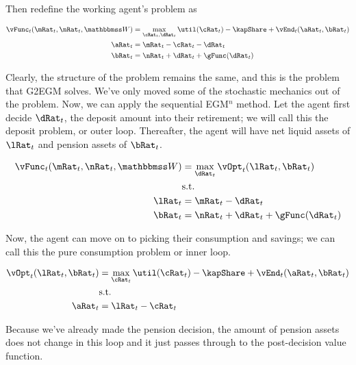 \documentclass[\econtexRoot/SequentialEGM]{subfiles}
\begin{document}
Then redefine the working agent's problem as

\begin{equation}
  \begin{split}
    \vFunc_{t}(\mRat_{t}, \nRat_{t}, \Work) & = \max_{\cRat_{t},
      \dRat_{t}} \util(\cRat_{t})  - \kapShare + \vEnd_{t}(\aRat_{t},
    \bRat_{t}) \\
    \aRat_{t} & = \mRat_{t} - \cRat_{t} - \dRat_{t} \\
    \bRat_{t} & = \nRat_{t} + \dRat_{t} + \gFunc(\dRat_{t}) \\
  \end{split}
\end{equation}

Clearly, the structure of the problem remains the same, and this is the problem
that G2EGM solves. We've only moved some
of the stochastic mechanics out of the problem. Now, we can apply the
sequential EGM$^n$ method. Let the agent first decide $\dRat_{t}$, the deposit
amount into their retirement; we will call this the deposit problem, or outer loop. Thereafter, the
agent will have net liquid assets
of $\lRat_{t}$ and pension assets of $\bRat_{t}$.

\begin{equation}
  \begin{split}
    \vFunc_{t}(\mRat_{t}, \nRat_{t}, \Work) & = \max_{\dRat_{t}}
    \vOpt_{t}(\lRat_{t}, \bRat_{t}) \\
    & \text{s.t.} \\
    \lRat_{t} & = \mRat_{t} - \dRat_{t} \\
    \bRat_{t} & = \nRat_{t} + \dRat_{t} + \gFunc(\dRat_{t})
  \end{split}
\end{equation}

Now, the agent can move on to picking their consumption and savings; we can call this
the pure consumption problem or inner loop.

\begin{equation}
  \begin{split}
    \vOpt_{t}(\lRat_{t}, \bRat_{t}) & = \max_{\cRat_{t}}
    \util(\cRat_{t}) - \kapShare  + \vEnd_{t}(\aRat_{t}, \bRat_{t}) \\
    & \text{s.t.} \\
    \aRat_{t} & = \lRat_{t} - \cRat_{t} \\
  \end{split}
\end{equation}

Because we've already made the pension decision, the amount of pension assets
does not change in this loop and it just passes through to the post-decision
value function.
\end{document}
